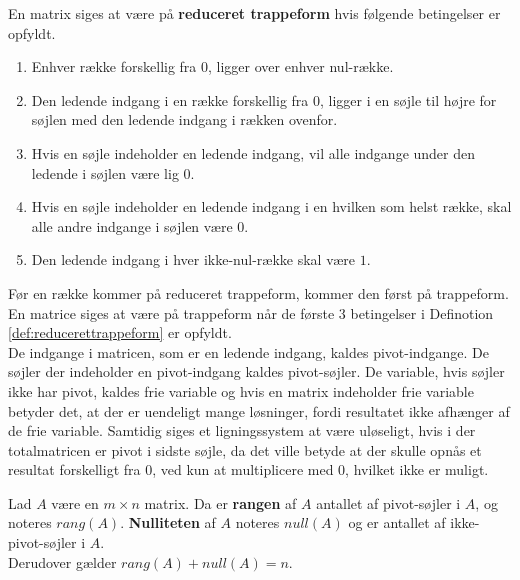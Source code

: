 \begin{defn}
En matrix siges at være på \textbf{reduceret trappeform} hvis følgende betingelser er opfyldt.
\begin{enumerate}
\item Enhver række forskellig fra 0, ligger over enhver nul-række.
\item Den ledende indgang i en række forskellig fra 0, ligger i en søjle til højre for søjlen med den ledende indgang i rækken ovenfor.
\item Hvis en søjle indeholder en ledende indgang, vil alle indgange under den ledende i søjlen være lig 0.
\item Hvis en søjle indeholder en ledende indgang i en hvilken som helst række, skal alle andre indgange i søjlen være $0$.
\item Den ledende indgang i hver ikke-nul-række skal være $1$.
\end{enumerate}
\label{def:reducerettrappeform}
\end{defn}
Før en række kommer på reduceret trappeform, kommer den først på trappeform. En matrice siges at være på trappeform når de første $3$ betingelser i Definotion \ref{def:reducerettrappeform} er opfyldt. \\

De indgange i matricen, som er en ledende indgang, kaldes pivot-indgange. De søjler der indeholder en pivot-indgang kaldes pivot-søjler. De variable, hvis søjler ikke har pivot, kaldes frie variable og hvis en matrix indeholder frie variable betyder det, at der er uendeligt mange løsninger, fordi resultatet ikke afhænger af de frie variable. Samtidig siges et ligningssystem at være uløseligt, hvis i der totalmatricen er pivot i sidste søjle, da det ville betyde at der skulle opnås et resultat forskelligt fra 0, ved kun at multiplicere med 0, hvilket ikke er muligt.\\

\begin{defn}
Lad $A$ være en $m \times n$ matrix. 
Da er \textbf{rangen} af $A$ antallet af pivot-søjler i $A$, og noteres $rang(A)$. 
\textbf{Nulliteten} af $A$ noteres $null(A)$ og er antallet af ikke-pivot-søjler i $A$. \\
Derudover gælder $rang(A) + null(A) = n$.
\end{defn}

